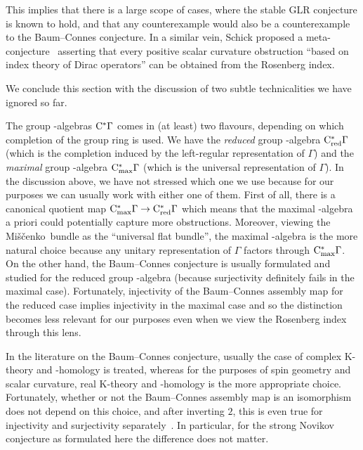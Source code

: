 \documentclass[pdftex]{sigma}
\numberwithin{equation}{section}
\newcommand*{\Mishchenko}{Mi\v{s}\v{c}enko}
\begin{document}
This implies that there is a large scope of cases, where the stable GLR conjecture is known to hold, and that any counterexample would also be a counterexample to the Baum--Connes conjecture.
In a similar vein, Schick proposed a meta-conjecture~\cite[Conjecture~1.5]{Schick:ICM} asserting that every positive scalar curvature obstruction ``based on index theory of Dirac operators'' can be obtained from the Rosenberg index.

We conclude this section with the discussion of two subtle technicalities we have ignored so far.
\begin{Remark}
 The group \textCstar-algebras \(\mathrm{C}^\ast\Gamma\) comes in (at least) two flavours, depending on which completion of the group ring is used.
 We have the \emph{reduced} group \textCstar-algebra \(\mathrm{C}^\ast_{\mathrm{red}} \Gamma\) (which is the completion induced by the left-regular representation of \(\Gamma\)) and the \emph{maximal} group \textCstar-algebra \(\mathrm{C}^\ast_{\mathrm{max}} \Gamma\) (which is the universal representation of \(\Gamma\)).
 In the discussion above, we have not stressed which one we use because for our purposes we can usually work with either one of them.
 First of all, there is a canonical quotient map \(\mathrm{C}^\ast_{\mathrm{max}} \Gamma \to \mathrm{C}^\ast_{\mathrm{red}} \Gamma\) which means that the maximal \textCstar-algebra a priori could potentially capture more obstructions.
 Moreover, viewing the \Mishchenko\ bundle as the ``universal flat bundle'', the maximal \textCstar-algebra is the more natural choice because any unitary representation of \(\Gamma\) factors through \(\mathrm{C}^\ast_{\mathrm{max}} \Gamma\).
 On the other hand, the Baum--Connes conjecture is usually formulated and studied for the reduced group \textCstar-algebra (because surjectivity definitely fails in the maximal case).
 Fortunately, injectivity of the Baum--Connes assembly map for the reduced case implies injectivity in the maximal case and so the distinction becomes less relevant for our purposes even when we view the Rosenberg index through this lens.
\end{Remark}

\begin{Remark}
 In the literature on the Baum--Connes conjecture, usually the case of complex K-theory and -homology is treated, whereas for the purposes of spin geometry and scalar curvature, real K-theory and -homology is the more appropriate choice.
 Fortunately, whether or not the Baum--Connes assembly map is an isomorphism does not depend on this choice,
 and after inverting \(2\), this is even true for injectivity and surjectivity separately~\cite{Baum-Karoubi:real-BC,Schick:real-vs-complex}.
 In particular, for the strong Novikov conjecture as formulated here the difference does not matter.
\end{Remark}
\end{document}
